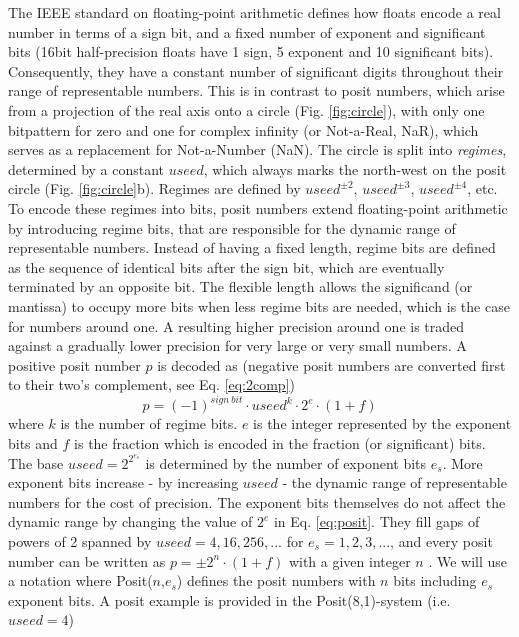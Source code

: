 \documentclass[draft]{agujournal2019}
\begin{document}
The IEEE standard on floating-point arithmetic \cite{IEEE} defines how floats encode a real number in terms of a sign bit, and a fixed number of exponent and significant bits (16bit half-precision floats have 1 sign, 5 exponent and 10 significant bits). Consequently, they have a constant number of significant digits throughout their range of representable numbers. This is in contrast to posit numbers, which arise from a projection of the real axis onto a circle (Fig. \ref{fig:circle}), with only one bitpattern for zero and one for complex infinity (or Not-a-Real, NaR), which serves as a replacement for Not-a-Number (NaN). The circle is split into \emph{regimes}, determined by a constant $useed$, which always marks the north-west on the posit circle (Fig. \ref{fig:circle}b). Regimes are defined by $useed^{\pm2}$, $useed^{\pm3}$, $useed^{\pm4}$, etc. To encode these regimes into bits, posit numbers extend floating-point arithmetic by introducing regime bits, that are responsible for the dynamic range of representable numbers. Instead of having a fixed length, regime bits are defined as the sequence of identical bits after the sign bit, which are eventually terminated by an opposite bit. The flexible length allows the significand (or mantissa) to occupy more bits when less regime bits are needed, which is the case for numbers around one. A resulting higher precision around one is traded against a gradually lower precision for very large or very small numbers. A positive posit number $p$ is decoded as \cite{Gustafson2017,Gustafson2017b} (negative posit numbers are converted first to their two's complement, see Eq. \ref{eq:2comp})
\begin{equation}
p = (-1)^{sign~bit} \cdot useed^k \cdot 2^e \cdot (1+f)
\label{eq:posit}
\end{equation}
where $k$ is the number of regime bits. $e$ is the integer represented by the exponent bits and $f$ is the fraction which is encoded in the fraction (or significant) bits. The base $useed = 2^{2^{e_s}}$ is determined by the number of exponent bits $e_s$. More exponent bits increase - by increasing $useed$ - the dynamic range of representable numbers for the cost of precision. The exponent bits themselves do not affect the dynamic range by changing the value of $2^e$ in Eq. \ref{eq:posit}. They fill gaps of powers of 2 spanned by $useed = 4,16,256,...$ for $e_s=1,2,3,...$, and every posit number can be written as $p = \pm 2^n \cdot (1+f)$ with a given integer $n$ \cite{Gustafson2017,Chen2018}. We will use a notation where Posit($n$,$e_s$) defines the posit numbers with $n$ bits including $e_s$ exponent bits. A posit example is provided in the Posit(8,1)-system (i.e. $useed = 4$)
\end{document}
